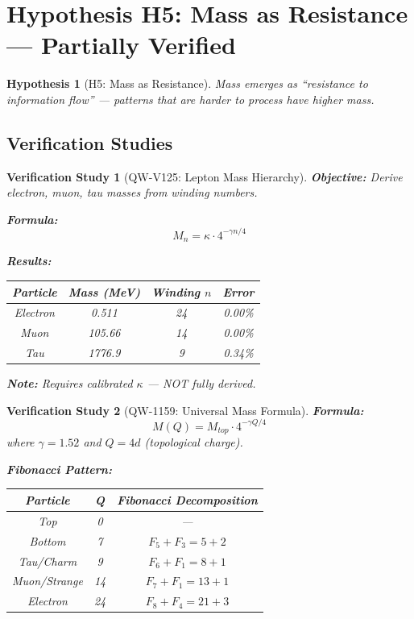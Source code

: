 \documentclass[11pt,a4paper]{book}
\newtheorem{hypothesis}{Hypothesis}[section]
\newtheorem{verification}{Verification Study}[section]
\theoremstyle{remark}
\begin{document}
\section{Hypothesis H5: Mass as Resistance --- Partially Verified}

\begin{hypothesis}[H5: Mass as Resistance]
Mass emerges as ``resistance to information flow'' --- patterns that are harder to process have higher mass.
\end{hypothesis}

\subsection{Verification Studies}

\begin{verification}[QW-V125: Lepton Mass Hierarchy]
\textbf{Objective:} Derive electron, muon, tau masses from winding numbers.

\textbf{Formula:}
\begin{equation}
M_n = \kappa \cdot 4^{-\gamma n/4}
\end{equation}

\textbf{Results:}
\begin{center}
\begin{tabular}{|c|c|c|c|}
\hline
Particle & Mass (MeV) & Winding $n$ & Error \\
\hline
Electron & 0.511 & 24 & 0.00\% \\
Muon & 105.66 & 14 & 0.00\% \\
Tau & 1776.9 & 9 & 0.34\% \\
\hline
\end{tabular}
\end{center}

\textbf{Note:} Requires calibrated $\kappa$ --- NOT fully derived.
\end{verification}

\begin{verification}[QW-1159: Universal Mass Formula]
\textbf{Formula:}
\begin{equation}
\boxed{M(Q) = M_{top} \cdot 4^{-\gamma Q/4}}
\end{equation}
where $\gamma = 1.52$ and $Q = 4d$ (topological charge).

\textbf{Fibonacci Pattern:}
\begin{center}
\begin{tabular}{|c|c|c|}
\hline
Particle & Q & Fibonacci Decomposition \\
\hline
Top & 0 & --- \\
Bottom & 7 & $F_5 + F_3 = 5 + 2$ \\
Tau/Charm & 9 & $F_6 + F_1 = 8 + 1$ \\
Muon/Strange & 14 & $F_7 + F_1 = 13 + 1$ \\
Electron & 24 & $F_8 + F_4 = 21 + 3$ \\
\hline
\end{tabular}
\end{center}
\end{verification}
\end{document}
